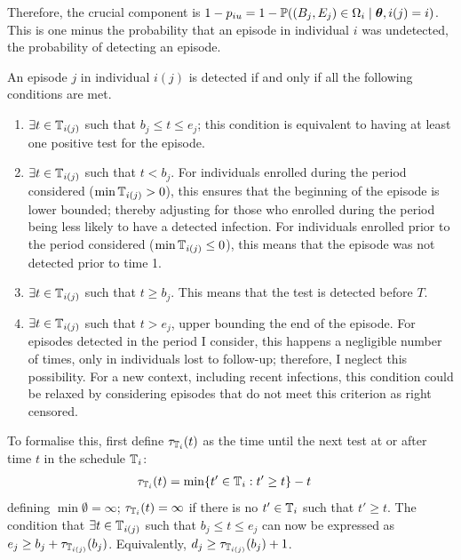 \documentclass[thesis.tex]{subfiles}
\begin{document}
Therefore, the crucial component is $1 - p_{iu} = 1 - \operatorname{\mathbb{P}}((B_j, E_j) \in \Omega_i \mid \bm{\theta}, i(j) = i)$.
This is one minus the probability that an episode in individual $i$ was undetected, \ie the probability of detecting an episode.

An episode $j$ in individual $i(j)$ is detected if and only if all the following conditions are met.
\begin{enumerate}
    \item $\exists t \in \mathbb{T}_{i(j)}$ such that $b_j \leq t \leq e_j$; this condition is equivalent to having at least one positive test for the episode.
    \item $\exists t \in \mathbb{T}_{i(j)}$ such that $t < b_j$.
      For individuals enrolled during the period considered ($\min \mathbb{T}_{i(j)} > 0$), this ensures that the beginning of the episode is lower bounded; thereby adjusting for those who enrolled during the period being less likely to have a detected infection.
      For individuals enrolled prior to the period considered ($\min \mathbb{T}_{i(j)} \leq 0$), this means that the episode was not detected prior to time 1.
    \item $\exists t \in \mathbb{T}_{i(j)}$ such that $t \geq b_j$.
      This means that the test is detected before $T$.
    \item $\exists t \in \mathbb{T}_{i(j)}$ such that $t > e_j$, upper bounding the end of the episode.
      For episodes detected in the period I consider, this happens a negligible number of times, only in individuals lost to follow-up; therefore, I neglect this possibility.
      For a new context, including recent infections, this condition could be relaxed by considering episodes that do not meet this criterion as right censored.
\end{enumerate}

To formalise this, first define $\tau_{\mathbb{T}_i}(t)$ as the time until the next test at or after time $t$ in the schedule $\mathbb{T}_i$:
\begin{align}
\tau_{\mathbb{T}_i}(t) &= \min \{ t' \in \mathbb{T}_i : t' \geq t \} - t
\end{align}
defining $\min \emptyset = \infty$; \ie $\tau_{\mathbb{T}_i}(t) = \infty$ if there is no $t' \in \mathbb{T}_i$ such that $t' \geq t$.
The condition that $\exists t \in \mathbb{T}_{i(j)}$ such that $b_j \leq t \leq e_j$ can now be expressed as $e_j \geq b_j + \tau_{\mathbb{T}_{i(j)}}(b_j)$.
Equivalently, $d_j \geq \tau_{\mathbb{T}_{i(j)}}(b_j) + 1$.
\end{document}
